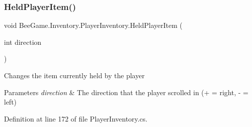 \subsubsection{\texorpdfstring{Held\+Player\+Item()}{HeldPlayerItem()}}
{\footnotesize\ttfamily void Bee\+Game.\+Inventory.\+Player\+Inventory.\+Held\+Player\+Item (\begin{DoxyParamCaption}\item[{int}]{direction }\end{DoxyParamCaption})}



Changes the item currently held by the player 


\begin{DoxyParams}{Parameters}
{\em direction} & The direction that the player scrolled in (+ = right, -\/ = left)\\
\hline
\end{DoxyParams}


Definition at line 172 of file Player\+Inventory.\+cs.



